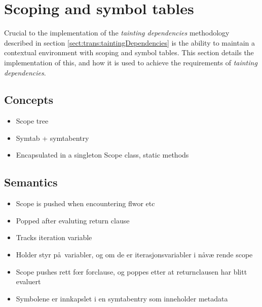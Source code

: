 \section{Scoping and symbol tables}
Crucial to the implementation of the \textit{tainting dependencies} methodology
described in section \ref{sect:trans:taintingDependencies} is the ability to
maintain a contextual environment with scoping and symbol tables. This section
details the implementation of this, and how it is used to achieve the
requirements of \textit{tainting dependencies}.

\subsection{Concepts}
\begin{itemize}
  \item Scope tree
  \item Symtab + symtabentry
  \item Encapsulated in a singleton Scope class, static methods
\end{itemize}

\subsection{Semantics}
\begin{itemize}
  \item Scope is pushed when encountering flwor etc
  \item Popped after evaluting return clause
  \item Tracks iteration variable
\end{itemize}

\begin{itemize}
  \item Holder styr p\aa~variabler, og om de er iterasjonsvariabler i n\aa v\ae
  rende scope
  \item Scope pushes rett f\oe r forclause, og poppes etter at returnclausen har
  blitt evaluert
  \item Symbolene er innkapslet i en symtabentry som inneholder metadata
\end{itemize}